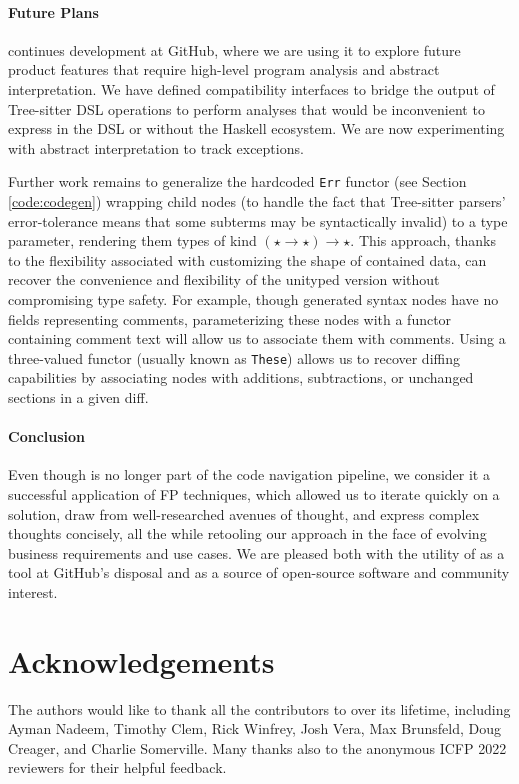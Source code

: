 \documentclass[acmsmall,fleqn,12pt]{acmart}
\begin{document}
\paragraph{Future Plans}
%
\semantic{} continues development at GitHub, where we are using it to explore
future product features that require high-level program analysis and abstract
interpretation. We have defined compatibility interfaces to bridge
the output of Tree-sitter DSL operations to perform analyses that would be
inconvenient to express in the DSL or without the Haskell ecosystem. We are
now experimenting with abstract interpretation to track exceptions.


Further work remains to generalize the hardcoded \texttt{Err} functor (see
Section \ref{code:codegen}) wrapping child nodes (to handle the fact that Tree-sitter
parsers' error-tolerance means that some subterms may be syntactically invalid)
to a type parameter, rendering them types of kind
$(\star \rightarrow \star) \rightarrow \star $. This approach, thanks to the
flexibility associated with customizing the shape of contained data, can recover
the convenience and flexibility of the unityped version without compromising
type safety. For example, though generated syntax nodes have no fields
representing comments, parameterizing these nodes with a functor containing
comment text will allow us to associate them with comments. Using a three-valued
functor (usually known as \texttt{These}) allows us to recover diffing
capabilities by associating nodes with additions, subtractions, or unchanged
sections in a given diff.

\paragraph{Conclusion}
Even though \semantic{} is no longer part of the code navigation pipeline, we
consider it a successful application of FP techniques, which allowed us to
iterate quickly on a solution, draw from well-researched avenues of thought,
and express complex thoughts concisely, all the while retooling our approach in
the face of evolving business requirements and use cases. We are pleased both
with the utility of \semantic{} as a tool at GitHub’s disposal and as a source
of open-source software and community interest.

\section*{Acknowledgements}
The authors would like to thank all the contributors to \semantic{} over its
lifetime, including Ayman Nadeem, Timothy Clem, Rick Winfrey, Josh Vera, Max
Brunsfeld, Doug Creager, and Charlie Somerville. Many thanks also to the anonymous
ICFP 2022 reviewers for their helpful feedback.


\clearpage
\end{document}
